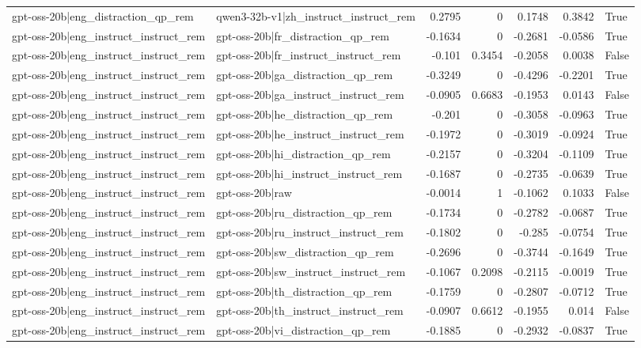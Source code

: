 \begin{table}
\begin{tabular}{l l r r r r l}
gpt-oss-20b|eng_distraction_qp_rem & qwen3-32b-v1|zh_instruct_instruct_rem & 0.2795 & 0 & 0.1748 & 0.3842 & True \\
gpt-oss-20b|eng_instruct_instruct_rem & gpt-oss-20b|fr_distraction_qp_rem & -0.1634 & 0 & -0.2681 & -0.0586 & True \\
gpt-oss-20b|eng_instruct_instruct_rem & gpt-oss-20b|fr_instruct_instruct_rem & -0.101 & 0.3454 & -0.2058 & 0.0038 & False \\
gpt-oss-20b|eng_instruct_instruct_rem & gpt-oss-20b|ga_distraction_qp_rem & -0.3249 & 0 & -0.4296 & -0.2201 & True \\
gpt-oss-20b|eng_instruct_instruct_rem & gpt-oss-20b|ga_instruct_instruct_rem & -0.0905 & 0.6683 & -0.1953 & 0.0143 & False \\
gpt-oss-20b|eng_instruct_instruct_rem & gpt-oss-20b|he_distraction_qp_rem & -0.201 & 0 & -0.3058 & -0.0963 & True \\
gpt-oss-20b|eng_instruct_instruct_rem & gpt-oss-20b|he_instruct_instruct_rem & -0.1972 & 0 & -0.3019 & -0.0924 & True \\
gpt-oss-20b|eng_instruct_instruct_rem & gpt-oss-20b|hi_distraction_qp_rem & -0.2157 & 0 & -0.3204 & -0.1109 & True \\
gpt-oss-20b|eng_instruct_instruct_rem & gpt-oss-20b|hi_instruct_instruct_rem & -0.1687 & 0 & -0.2735 & -0.0639 & True \\
gpt-oss-20b|eng_instruct_instruct_rem & gpt-oss-20b|raw & -0.0014 & 1 & -0.1062 & 0.1033 & False \\
gpt-oss-20b|eng_instruct_instruct_rem & gpt-oss-20b|ru_distraction_qp_rem & -0.1734 & 0 & -0.2782 & -0.0687 & True \\
gpt-oss-20b|eng_instruct_instruct_rem & gpt-oss-20b|ru_instruct_instruct_rem & -0.1802 & 0 & -0.285 & -0.0754 & True \\
gpt-oss-20b|eng_instruct_instruct_rem & gpt-oss-20b|sw_distraction_qp_rem & -0.2696 & 0 & -0.3744 & -0.1649 & True \\
gpt-oss-20b|eng_instruct_instruct_rem & gpt-oss-20b|sw_instruct_instruct_rem & -0.1067 & 0.2098 & -0.2115 & -0.0019 & True \\
gpt-oss-20b|eng_instruct_instruct_rem & gpt-oss-20b|th_distraction_qp_rem & -0.1759 & 0 & -0.2807 & -0.0712 & True \\
gpt-oss-20b|eng_instruct_instruct_rem & gpt-oss-20b|th_instruct_instruct_rem & -0.0907 & 0.6612 & -0.1955 & 0.014 & False \\
gpt-oss-20b|eng_instruct_instruct_rem & gpt-oss-20b|vi_distraction_qp_rem & -0.1885 & 0 & -0.2932 & -0.0837 & True \\

\end{tabular}
\end{table}
